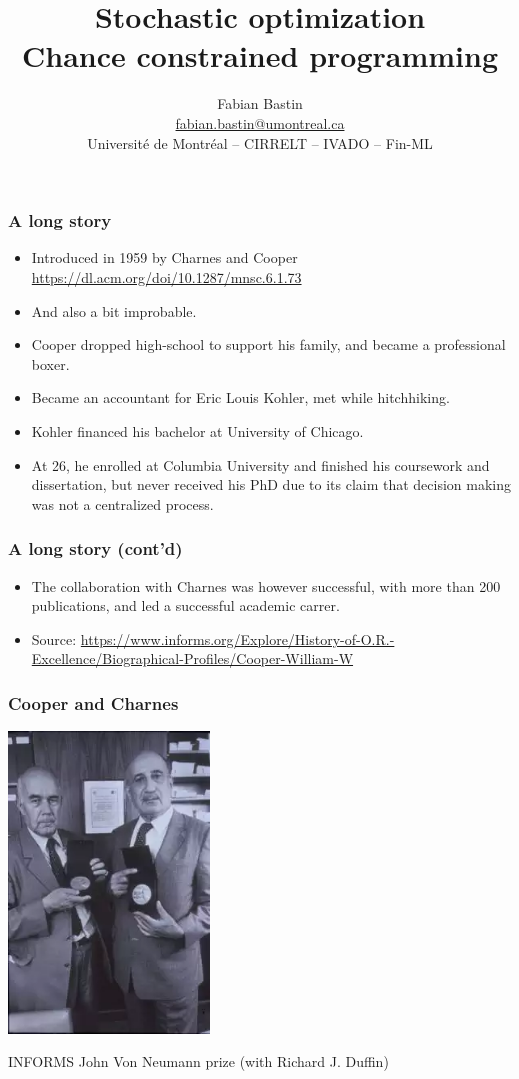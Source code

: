 \documentclass{beamer}
\title[CP]{Stochastic optimization\\Chance constrained programming}
\author[Fabian Bastin]{Fabian Bastin \\ \url{fabian.bastin@umontreal.ca} \\ Université de Montréal -- CIRRELT -- IVADO -- Fin-ML}
\date{}
\begin{document}

\frame{\titlepage}

\begin{frame}
\frametitle{A long story}

\begin{itemize}
	\item 
Introduced in 1959 by Charnes and Cooper \url{https://dl.acm.org/doi/10.1287/mnsc.6.1.73}
	\item 
And also a bit improbable.
	\item 
Cooper dropped high-school to support his family, and became a professional boxer.
	\item 
Became an accountant for Eric Louis Kohler, met while hitchhiking.
	\item 
Kohler financed his bachelor at University of Chicago.
\item
At 26, he enrolled at Columbia University and finished his coursework and dissertation, but never received his PhD due to its claim that decision making was not a centralized process.
\end{itemize}

\end{frame}

\begin{frame}
\frametitle{A long story (cont'd)}
	
\begin{itemize}
\item
The collaboration with Charnes was however successful, with more than 200 publications, and led a successful academic carrer.
\item 
Source: \url{https://www.informs.org/Explore/History-of-O.R.-Excellence/Biographical-Profiles/Cooper-William-W}
\end{itemize}

\end{frame}

\begin{frame}[fragile]
\frametitle{Cooper and Charnes}

\begin{center}
\includegraphics[width=0.4\textwidth]{imgs/coopercharnes.png}

INFORMS John Von Neumann prize (with Richard J. Duffin)
\end{center}

\end{frame}
\end{document}
